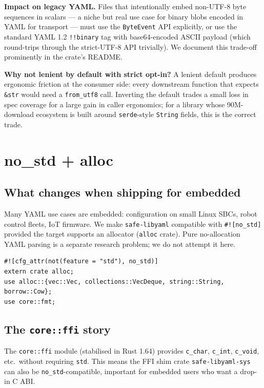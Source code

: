 \documentclass[12pt]{article}
\theoremstyle{definition}
\theoremstyle{remark}
\begin{document}
\noindent\textbf{Impact on legacy YAML.} Files that intentionally embed
non-UTF-8 byte sequences in scalars --- a niche but real use case for
binary blobs encoded in YAML for transport --- must use the
\texttt{ByteEvent} API explicitly, or use the standard YAML 1.2
\texttt{!!binary} tag with base64-encoded ASCII payload (which round-trips
through the strict-UTF-8 API trivially). We document this trade-off
prominently in the crate's README.

\noindent\textbf{Why not lenient by default with strict opt-in?} A lenient
default produces ergonomic friction at the consumer side: every downstream
function that expects \texttt{\&str} would need a \texttt{from\_utf8}
call. Inverting the default trades a small loss in spec coverage for a
large gain in caller ergonomics; for a library whose 90M-download
ecosystem is built around \texttt{serde}-style \texttt{String} fields,
this is the correct trade.

\section{no\_std + alloc}
\label{sec:nostd}

\subsection{What changes when shipping for embedded}

Many YAML use cases are embedded: configuration on small Linux SBCs, robot
control fleets, IoT firmware. We make \texttt{safe-libyaml} compatible with
\texttt{\#![no\_std]} provided the target supports an allocator
(\texttt{alloc} crate). Pure no-allocation YAML parsing is a separate
research problem; we do not attempt it here.

\begin{lstlisting}
#![cfg_attr(not(feature = "std"), no_std)]
extern crate alloc;
use alloc::{vec::Vec, collections::VecDeque, string::String, borrow::Cow};
use core::fmt;
\end{lstlisting}

\subsection{The \texttt{core::ffi} story}

The \texttt{core::ffi} module (stabilised in Rust 1.64) provides
\texttt{c\_char}, \texttt{c\_int}, \texttt{c\_void}, etc.\ without requiring
\texttt{std}. This means the FFI shim crate \texttt{safe-libyaml-sys}
can also be \texttt{no\_std}-compatible, important for embedded users who
want a drop-in C ABI.
\end{document}
